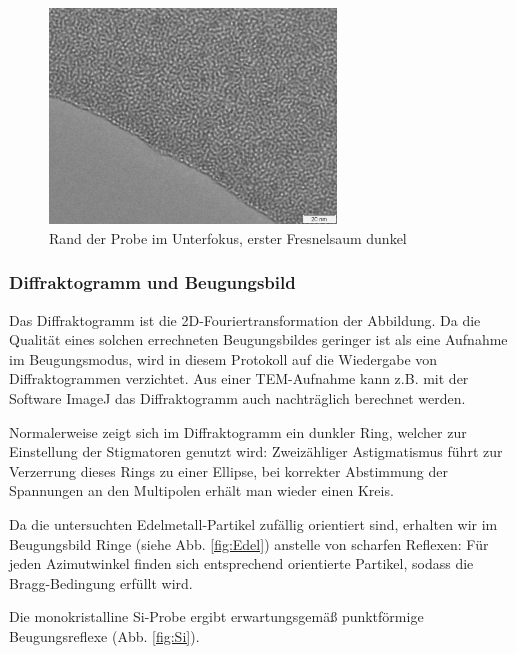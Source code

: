 \begin{figure}[p]
	\centering
	\includegraphics[width=0.68\textwidth]{data/Im_2.jpg}
	\vspace{-1.5ex}
	\caption{Rand der Probe im Unterfokus, erster Fresnelsaum dunkel}	\label{fig:Ueber}
	\vspace{-9em}
\end{figure}

\subsubsection{Diffraktogramm und Beugungsbild}
Das Diffraktogramm ist die 2D-Fouriertransformation der Abbildung. Da die Qualität eines solchen errechneten Beugungsbildes geringer ist als eine Aufnahme im Beugungsmodus, wird in diesem Protokoll auf die Wiedergabe von Diffraktogrammen verzichtet. Aus einer TEM-Aufnahme kann z.B. mit der Software ImageJ das Diffraktogramm auch nachträglich berechnet werden.


Normalerweise zeigt sich im Diffraktogramm ein dunkler Ring, welcher zur Einstellung der Stigmatoren genutzt wird: Zweizähliger Astigmatismus führt zur Verzerrung dieses Rings zu einer Ellipse, bei korrekter Abstimmung der Spannungen an den Multipolen erhält man wieder einen Kreis.

Da die untersuchten Edelmetall-Partikel zufällig orientiert sind, erhalten wir im Beugungsbild Ringe (siehe Abb. \ref{fig:Edel}) anstelle von scharfen Reflexen: Für jeden Azimutwinkel finden sich entsprechend orientierte Partikel, sodass die Bragg-Bedingung erfüllt wird.

Die monokristalline \textsf{Si}-Probe ergibt erwartungsgemäß punktförmige Beugungsreflexe (Abb. \ref{fig:Si}).

